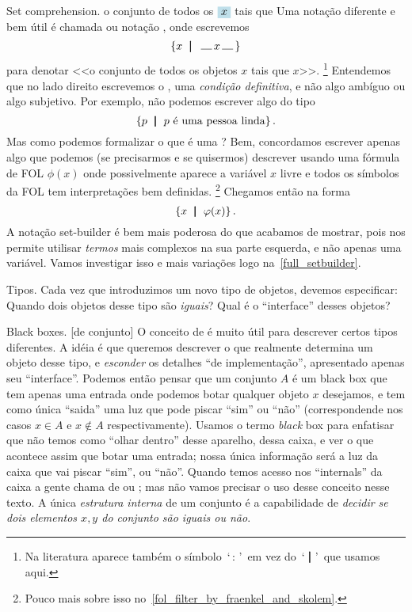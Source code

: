  Set comprehension.
\label{set_comprehension}%
\label{definite_condition}%
%
%
 {o conjunto de todos os $\holed x$ tais que \thole}%
%
Uma notação diferente e bem útil é chamada
 ou notação ,
onde escrevemos
$$
\setst x {\text{\thole$x$\thole}}
$$
para denotar <<o conjunto de todos os objetos $x$ tais que \thole$x$\thole>>.
\footnote{Na literatura aparece também o símbolo~`\,$:$\,'~em vez
do~`$\;\mathord{\pmb{\mid}}\;$'~que usamos aqui.}
Entendemos que no lado direito escrevemos o ,
uma \emph{condição definitiva},
e não algo ambíguo ou algo subjetivo.  Por exemplo, não podemos escrever 
algo do tipo
$$
\left\{p \ \;\mathord{\pmb{\mid}}\;\  \text{$p$ é uma pessoa linda} \right\}.
$$
Mas como podemos formalizar o que é uma ?
Bem, concordamos escrever apenas algo que podemos (se precisarmos e se quisermos)
descrever usando uma fórmula de FOL $\phi(x)$ onde possivelmente aparece
a variável $x$ livre e todos os símbolos da FOL tem interpretações bem definidas.%
\footnote{Pouco mais sobre isso no~\ref{fol_filter_by_fraenkel_and_skolem}.}
Chegamos então na forma
$$
\left\{x \ \;\mathord{\pmb{\mid}}\;\ \varphi(x)\right\}.
$$
A notação set-builder é bem mais poderosa do que acabamos de mostrar,
pois nos permite utilisar \emph{termos} mais complexos na sua parte esquerda,
e não apenas uma variável.
Vamos investigar isso e mais variações logo na~\ref{full_setbuilder}.

\note Tipos.
Cada vez que introduzimos um novo tipo de objetos,
devemos especificar:
\beginol
\li Quando dois objetos desse tipo são \emph{iguais}?
\li Qual é o ``interface'' desses objetos?
\endol

\note Black boxes.
\label{blackbox_set}%
%
%
%
%
[de conjunto]%
%
O conceito de  é muito útil para descrever certos tipos diferentes.
A idéia é que queremos descrever o que realmente determina um objeto desse tipo,
e \emph{esconder} os detalhes ``de implementação'', apresentado apenas seu ``interface''.
Podemos então pensar que um conjunto $A$ é um black box que tem apenas uma
entrada onde podemos botar qualquer objeto $x$ desejamos, e tem como única
``saida'' uma luz que pode piscar ``sim'' ou ``não'' (correspondende nos casos
$x\in A$ e $x\notin A$ respectivamente).
\endgraf
Usamos o termo \emph{black} box para enfatisar que não temos como ``olhar dentro''
desse aparelho, dessa caixa, e ver o que acontece assim que botar uma entrada;
nossa única informação será a luz da caixa que vai piscar ``sim'', ou ``não''.
Quando temos acesso nos ``internals'' da caixa a gente chama de 
ou ; mas não vamos precisar o uso desse conceito nesse texto.
\endgraf
A única \emph{estrutura interna} de um conjunto é a capabilidade de
\emph{decidir se dois elementos $x,y$ do conjunto são iguais ou não}.

